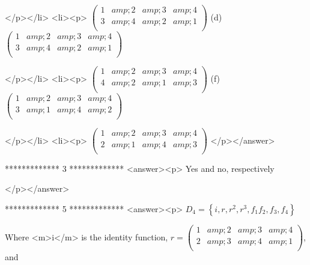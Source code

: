 </p></li>
<li><p>      \(\left(
\begin{array}{cccc}
 1 &amp; 2 &amp; 3 &amp; 4 \\
 3 &amp; 4 &amp; 2 &amp; 1 \\
\end{array}
\right)\)      (d)     \(\left(
\begin{array}{cccc}
 1 &amp; 2 &amp; 3 &amp; 4 \\
 3 &amp; 4 &amp; 2 &amp; 1 \\
\end{array}
\right)\)

</p></li>
<li><p>      \(\left(
\begin{array}{cccc}
 1 &amp; 2 &amp; 3 &amp; 4 \\
 4 &amp; 2 &amp; 1 &amp; 3 \\
\end{array}
\right)\)      (f)     \(\left(
\begin{array}{cccc}
 1 &amp; 2 &amp; 3 &amp; 4 \\
 3 &amp; 1 &amp; 4 &amp; 2 \\
\end{array}
\right)\)

</p></li>
<li><p>      \(\left(
\begin{array}{cccc}
 1 &amp; 2 &amp; 3 &amp; 4 \\
 2 &amp; 1 &amp; 4 &amp; 3 \\
\end{array}
\right)\)    </p></answer>


*************
3
*************
<answer><p>  Yes and no, respectively

</p></answer>


*************
5
*************
<answer><p> \(D_4 = \left\{i, r, r^2 , r^3 , f_1 f_2,f_3, f_4\right\}\)



Where <m>i</m> is the identity function, \(r=\left(
\begin{array}{cccc}
 1 &amp; 2 &amp; 3 &amp; 4 \\
 2 &amp; 3 &amp; 4 &amp; 1 \\
\end{array}
\right)\), and 



